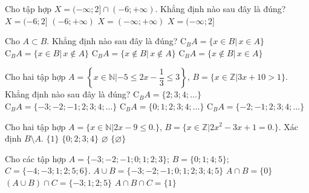 \begin{ex}%
	Cho tập hợp $X=(-\infty;2]\cap (-6;+\infty)$. Khẳng định nào sau đây là đúng?
	\choice
	{\True $X=(-6;2]$}
	{$(-6;+\infty)$}
	{$X=(-\infty;+\infty)$}
	{$X=(-\infty;2]$}
	\loigiai{
		Ta có $X=(-\infty;2]\cap (-6;+\infty)=(-6;2]$.}
\end{ex}
\begin{ex}%
	Cho $A\subset B$. Khẳng định nào sau đây là đúng?
	\choice
	{$\mathrm{C}_B A=\{x\in B|\,x\in A\}$}
	{\True $\mathrm{C}_B A=\{x\in B|\,x\notin A\}$}
	{$\mathrm{C}_B A=\{x\notin B|\,x\notin A\}$}
	{$\mathrm{C}_B A=\{x\notin B|\,x\in A\}$}
\end{ex}
\begin{ex}%
	Cho hai tập hợp $A=\left\{x\in \mathbb{N}|-5\le 2x-\dfrac{1}{3}\le 3\right\},\,B=\{x\in \mathbb{Z}|3x+10>1\}$. Khẳng định nào sau đây là đúng?
	\choice
	{$\mathrm{C}_B A=\{2;3;4;\ldots\}$}
	{$\mathrm{C}_B A=\{-3;-2;-1;2;3;4;\ldots\}$}
	{$\mathrm{C}_B A=\{0;1;2;3;4;\ldots\}$}
	{\True $\mathrm{C}_B A=\{-2;-1;2;3;4;\ldots\}$}
\end{ex}
\begin{ex}%
	Cho hai tập hợp $A=\{x\in \mathbb{N}| 2x-9\le 0 .\}$, $B=\{x\in \mathbb{Z}| 2x^2-3x+1=0 .\}$. Xác định $B\setminus A$.
	\choice
	{$\{1\}$}
	{$\{0;2;3;4\}$}
	{\True $\varnothing $}
	{$\{\varnothing\}$}
\end{ex}
\cauds
\begin{ex}%
	Cho các tập hợp $A=\{-3;-2;-1;0;1;2;3\}$; $B=\{0;1;4;5\}$; $C=\{-4;-3;1;2;5;6\}$.
	\choiceTF
	{\True $A\cup B=\{-3;-2;-1;0;1;2;3;4;5\}$}
	{$A\cap B=\{0\}$}
	{\True $(A\cup B)\cap C=\{-3;1;2;5\}$}
	{\True $A\cap B\cap C=\{1\}$}
\end{ex}
